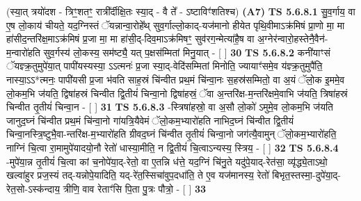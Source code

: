 \documentclass[17pt]{extarticle}
\begin{document}
                  \newline
                      (स्या॒त् त्रयो॑दश - त्रिꣳ॒॒शतꣳ॒॒ रात्री᳚र्दीक्षि॒तः स्या॒द् - वै ते᳚ - ऽष्टाविꣳ॑शतिश्च)  \textbf{(A7)} \newline \newline
                                        \textbf{ TS 5.6.8.1} \newline
                  सु॒व॒र्गाय॒ वा ए॒ष लो॒काय॑ चीयते॒ यद॒ग्निस्तं ॅयन्नान्वा॒रोहे᳚थ् सुव॒र्गाल्लो॒काद्-यज॑मानो हीयेत पृथि॒वीमाऽक्र॑मिषं प्रा॒णो मा॒ मा हा॑सीद॒न्तरि॑क्ष॒माऽक्र॑मिषं प्र॒जा मा॒ मा हा॑सी॒द्-दिव॒माऽक्र॑मिषꣳ॒॒ सुव॑रग॒न्मेत्या॑है॒ष वा अ॒ग्नेर॑न्वारो॒हस्तेनै॒वैन॑-म॒न्वारो॑हति सुव॒र्गस्य॑ लो॒कस्य॒ सम॑ष्ट्यै॒ यत् प॒क्षस॑म्मितां मिनु॒यात् - [  ] \textbf{  30} \newline
                  \newline
                                \textbf{ TS 5.6.8.2} \newline
                  कनी॑याꣳसं ॅयज्ञ्क्र॒तुमुपे॑या॒त् पापी॑यस्यस्या॒ ऽऽत्मनः॑ प्र॒जा स्या॒द्-वेदि॑सम्मितां मिनोति॒ ज्यायाꣳ॑समे॒व य॑ज्ञ्क्र॒तुमुपै॑ति॒ नास्या॒ऽऽ*त्मनः॒ पापी॑यसी प्र॒जा भ॑वति साह॒स्रं चि॑न्वीत प्रथ॒मं चि॑न्वा॒नः स॒हस्र॑सम्मितो॒ वा अ॒यं ॅलो॒क इ॒ममे॒व लो॒कम॒भि ज॑यति॒ द्विषा॑हस्रं चिन्वीत द्वि॒तीयं॑ चिन्वा॒नो द्विषा॑हस्रं॒ ॅवा अ॒न्तरि॑क्ष-म॒न्तरि॑क्षमे॒वाभि ज॑यति॒ त्रिषा॑हस्रं चिन्वीत तृ॒तीयं॑ चिन्वा॒न - [  ] \textbf{  31} \newline
                  \newline
                                \textbf{ TS 5.6.8.3} \newline
                  -स्त्रिषा॑हस्रो॒ वा अ॒सौ लो॒को॑ ऽमुमे॒व लो॒कम॒भि ज॑यति जानुद॒घ्नं चि॑न्वीत प्रथ॒मं चि॑न्वा॒नो गा॑यत्रि॒यैवेमं ॅलो॒कम॒भ्यारो॑हति नाभिद॒घ्नं चि॑न्वीत द्वि॒तीयं॑ चिन्वा॒नस्त्रि॒ष्टुभै॒वा-न्तरि॑क्ष-म॒भ्यारो॑हति ग्रीवद॒घ्नं चि॑न्वीत तृ॒तीयं॑ चिन्वा॒नो जग॑त्यै॒वामुन् ॅलो॒कम॒भ्यारो॑हति॒ नाग्निं चि॒त्वा रा॒मामुपे॑यादयो॒नौ रेतो॑ धास्या॒मीति॒ न द्वि॒तीयं॑ चि॒त्वाऽन्यस्य॒ स्त्रिय॒ - [  ] \textbf{  32} \newline
                  \newline
                                \textbf{ TS 5.6.8.4} \newline
                  -मुपे॑या॒न्न तृ॒तीयं॑ चि॒त्वा कां च॒नोपे॑या॒द्-रेतो॒ वा ए॒तन्नि ध॑त्ते॒ यद॒ग्निं चि॑नु॒ते यदु॑पे॒याद्-रेत॑सा॒ व्यृ॑द्ध्ये॒ताऽथो॒ खल्वा॑हुर प्रज॒स्यं तद्-यन्नोपे॒यादिति॒ यद्-रे॑त॒स्सिचा॑वुप॒दधा॑ति॒ ते ए॒व यज॑मानस्य॒ रेतो॑ बिभृत॒स्तस्मा॒-दुपे॑या॒द्-रेत॒सो-ऽस्क॑न्दाय॒ त्रीणि॒ वाव रेताꣳ॑सि पि॒ता पु॒त्रः पौत्रो॒ - [  ] \textbf{  33} \newline
\end{document}
